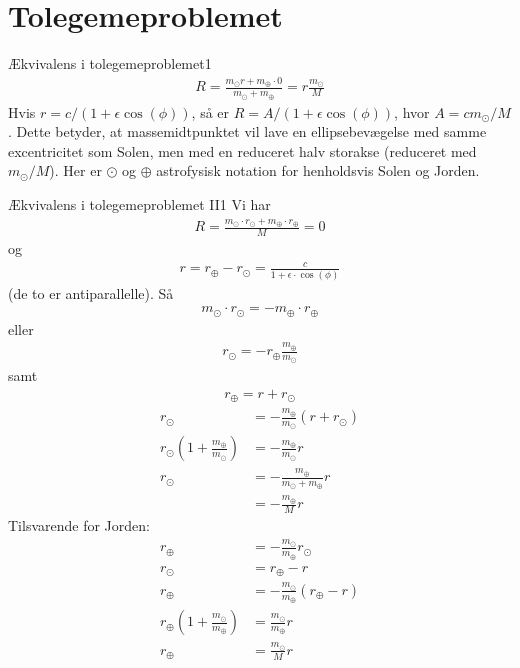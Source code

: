 \section*{Tolegemeproblemet}
%
%
\begin{opgave}{Ækvivalens i tolegemeproblemet}{1}
\begin{align*}
	R = \frac{m_\odot r + m_\oplus\cdot 0}{m_\odot + m_\oplus} =r\frac{m_\odot}{M}
\end{align*}
Hvis $r = c/(1+\epsilon\cos(\phi))$, så er $R = A/(1 + \epsilon\cos(\phi))$, hvor $A = c m_\odot/M$.
Dette betyder, at massemidtpunktet vil lave en ellipsebevægelse med samme excentricitet som Solen, men med en reduceret halv storakse (reduceret med $m_\odot/M$). Her er $\odot$ og $\oplus$ astrofysisk notation for henholdsvis Solen og Jorden.
\end{opgave}
%
%
\begin{opgave}{Ækvivalens i tolegemeproblemet II}{1}
Vi har
\begin{align*}
	R = \frac{m_\odot \cdot r_\odot + m_\oplus \cdot r_\oplus}{M} = 0
\end{align*}
og
\begin{align*}
	r = r_\oplus - r_\odot = \frac{c}{1+\epsilon\cdot\cos(\phi)}
\end{align*}
(de to er antiparallelle).
%
Så
\begin{align*}
	m_\odot \cdot r_\odot = - m_\oplus \cdot r_\oplus
\end{align*}
eller
\begin{align*}
	r_\odot = -r_\oplus \frac{m_\oplus}{m_\odot}
\end{align*}
samt
\begin{align*}
	r_\oplus = r + r_\odot
\end{align*}
%
\begin{align*}
	r_\odot &= - \frac{m_\oplus}{m_\odot} (r + r_\odot) \\
r_\odot \left(1 + \frac{m_\oplus}{m_\odot}\right) &= - \frac{m_\oplus}{m_\odot} r \\
r_\odot &= - \frac{m_\oplus}{m_\odot + m_\oplus} r \\
        &= - \frac{m_\oplus}{M} r
\end{align*}
%
Tilsvarende for Jorden:
\begin{align*}
	r_\oplus &= - \frac{m_\odot}{m_\oplus} r_\odot \\
	r_\odot &= r_\oplus - r \\[5mm]
	r_\oplus &= - \frac{m_\odot}{m_\oplus} (r_\oplus - r) \\
	r_\oplus \left(1 + \frac{m_\odot}{m_\oplus}\right) &=  \frac{m_\odot}{m_\oplus} r \\
	r_\oplus &= \frac{m_\odot}{M} r
\end{align*}
\end{opgave}
%
%
%

